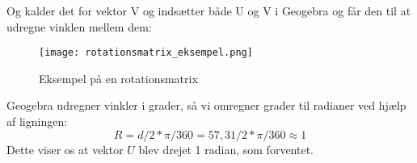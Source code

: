 Og kalder det for vektor V og indsætter både U og V i Geogebra og får den til at udregne vinklen mellem dem:
\begin{figure}[H]
	\center\texttt{[image: rotationsmatrix\_eksempel.png]}
	\center\caption{Eksempel på en rotationsmatrix}
  \label{fig:rotationsmatrix_eksempel}
\end{figure}
Geogebra udregner vinkler i grader, så vi omregner grader til radianer ved hjælp af ligningen:
\begin{equation}
	R=d/2*\pi/360=57,31/2*\pi/360\approx1
\end{equation}
Dette viser os at vektor $U$ blev drejet 1 radian, som forventet.